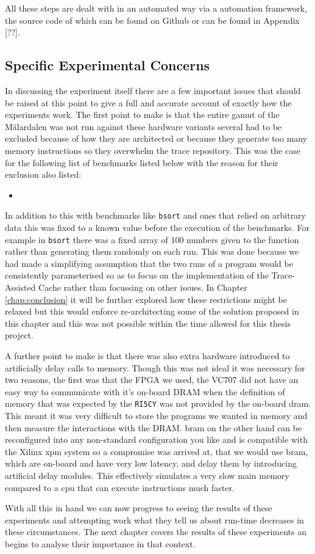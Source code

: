 All these steps are dealt with in an automated way via a automation framework, the source code of which can be found on Github or can be found in Appendix [??]. 

\subsection{Specific Experimental Concerns}

In discussing the experiment itself there are a few important issues that should be raised at this point to give a full and accurate account of exactly how the experiments work. The first point to make is that the entire gamut of the Mälardalen was not run against these hardware variants several had to be excluded because of how they are architected or because they generate too many memory instructions so they overwhelm the trace repository. This was the case for the following list of benchmarks listed below with the reason for their exclusion also listed:


\begin{itemize}
	\item 
\end{itemize}
 
In addition to this with benchmarks like \texttt{bsort} and ones that relied on arbitrary data this was fixed to a known value before the execution of the benchmarks. For example in \texttt{bsort} there was a fixed array of 100 numbers given to the function rather than generating them randomly on each run. This was done because we had made a simplifying assumption that the two runs of a program would be consistently parameterised so as to focus on the implementation of the Trace-Assisted Cache rather than focussing on other issues. In Chapter \ref{chap:conclusion} it will be further explored how these restrictions might be relaxed but this would enforce re-architecting some of the solution proposed in this chapter and this was not possible within the time allowed for this thesis project.

A further point to make is that there was also extra hardware introduced to artificially delay calls to memory. Though this was not ideal it was necessary for two reasons, the first was that the FPGA we used, the VC707 did not have an easy way to communicate with it's on-board DRAM when the definition of memory that was expected by the \texttt{RI5CY} was not provided by the on-board \gls{dram}. This meant it was very difficult to store the programs we wanted in memory and then measure the interactions with the DRAM. \gls{bram} on the other hand can be reconfigured into any non-standard configuration you like and is compatible with the Xilinx \gls{xpm} system so a compromise was arrived at, that we would use \gls{bram}, which are on-board and have very low latency, and delay them by introducing artificial delay modules. This effectively simulates a very slow main memory compared to a \gls{cpu} that can execute instructions much faster.

With all this in hand we can now progress to seeing the results of these experiments and attempting work what they tell us about run-time decreases in these circumstances. The next chapter covers the results of these experiments an begins to analyse their importance in that context.
